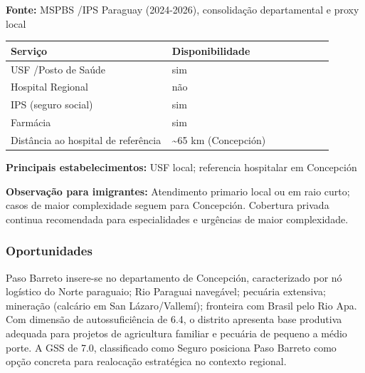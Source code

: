 \textbf{Fonte:} MSPBS /\allowbreak \allowbreak  IPS Paraguay (2024-2026), consolidação
departamental e proxy local

{\def\LTcaptype{none} %
\begin{longtable}{@{}>{\raggedright\arraybackslash}p{0.45\linewidth} >{\raggedright\arraybackslash}p{0.45\linewidth}@{}}
\toprule\noalign{}
Serviço & Disponibilidade \\
\midrule\noalign{}
\endhead
\bottomrule\noalign{}
\endlastfoot
USF /\allowbreak \allowbreak  Posto de Saúde & sim \\
Hospital Regional & não \\
IPS (seguro social) & sim \\
Farmácia & sim \\
Distância ao hospital de referência & \textasciitilde65 km
(Concepción) \\
\end{longtable}
}

\textbf{Principais estabelecimentos:} USF local; referencia hospitalar
em Concepción

\textbf{Observação para imigrantes:} Atendimento primario local ou em
raio curto; casos de maior complexidade seguem para Concepción.
Cobertura privada continua recomendada para especialidades e urgências
de maior complexidade.
\newpage

\subsubsection*{Oportunidades}\label{oport-paso-barreto-0111}
Paso Barreto insere-se no departamento de Concepción, caracterizado por nó logístico do Norte paraguaio; Rio Paraguai navegável; pecuária extensiva; mineração (calcário em San Lázaro/Vallemí); fronteira com Brasil pelo Rio Apa. Com dimensão de autossuficiência de 6.4, o distrito apresenta base produtiva adequada para projetos de agricultura familiar e pecuária de pequeno a médio porte. A GSS de 7.0, classificado como Seguro posiciona Paso Barreto como opção concreta para realocação estratégica no contexto regional.

